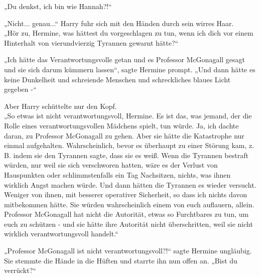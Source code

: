 {„Du denkst, ich bin wie Hannah?!“

„Nicht... genau...“ Harry fuhr sich mit den Händen durch sein wirres Haar.\\ „Hör zu, Hermine, was hättest du vorgeschlagen zu tun, wenn ich dich vor einem Hinterhalt von vierundvierzig Tyrannen gewarnt hätte?“

„Ich hätte das Verantwortungsvolle getan und es Professor McGonagall gesagt und sie sich darum kümmern lassen“, sagte Hermine prompt. „Und dann hätte es keine Dunkelheit und schreiende Menschen und schreckliches blaues Licht gegeben -“

Aber Harry schüttelte nur den Kopf.\\ „So etwas ist nicht verantwortungsvoll, Hermine. Es ist das, was jemand, der die Rolle eines verantwortungsvollen Mädchens spielt, tun würde. Ja, ich dachte daran, zu Professor McGonagall zu gehen. Aber sie hätte die Katastrophe nur einmal aufgehalten. Wahrscheinlich, bevor es überhaupt zu einer Störung kam, z. B. indem sie den Tyrannen sagte, dass sie es weiß. Wenn die Tyrannen bestraft würden, nur weil sie sich verschworen hatten, wäre es der Verlust von Hauspunkten oder schlimmstenfalls ein Tag Nachsitzen, nichts, was ihnen wirklich Angst machen würde. Und dann hätten die Tyrannen es wieder versucht. Weniger von ihnen, mit besserer operativer Sicherheit, so dass ich nichts davon mitbekommen hätte. Sie würden wahrscheinlich einem von euch auflauern, allein. Professor McGonagall hat nicht die Autorität, etwas so Furchtbares zu tun, um euch zu schützen - und sie hätte ihre Autorität nicht überschritten, weil sie nicht wirklich verantwortungsvoll handelt.“

„Professor McGonagall ist nicht verantwortungsvoll?!“ sagte Hermine ungläubig.\\ Sie stemmte die Hände in die Hüften und starrte ihn nun offen an. „Bist du verrückt?“

}
